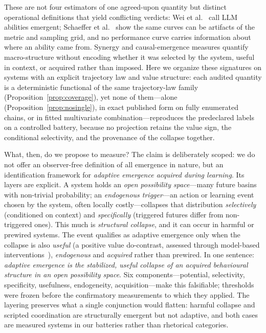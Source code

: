 \documentclass[11pt]{article}
\theoremstyle{definition}
\begin{document}
These are not four estimators of one agreed-upon quantity but distinct
operational definitions that yield conflicting verdicts: Wei et
al.~\cite{wei2022} call LLM abilities emergent; Schaeffer et
al.~\cite{schaeffer2023} show the same curves can be artifacts of the
metric and sampling grid, and no performance curve carries information
about where an ability came from. Synergy and causal-emergence
measures quantify macro-structure without encoding whether it was
selected by the system, useful in context, or acquired rather than
imposed. Here we organize these signatures on systems with an explicit
trajectory law and value structure: each audited quantity is a
deterministic functional of the same trajectory-law family
(Proposition~\ref{prop:coverage}), yet none of them---alone
(Proposition~\ref{prop:nosingle}), in exact published form on fully
enumerated chains, or in fitted multivariate combination---reproduces
the predeclared labels on a controlled battery, because no projection
retains the value sign, the conditional selectivity, and the
provenance of the collapse together.

What, then, do we propose to measure? The claim is deliberately scoped:
we do not offer an observer-free definition of all emergence in nature,
but an identification framework for \emph{adaptive emergence acquired
during learning}. Its layers are explicit. A system holds an \emph{open
possibility space}---many future basins with non-trivial probability;
an \emph{endogenous trigger}---an action or learning event chosen by
the system, often locally costly---collapses that distribution
\emph{selectively} (conditioned on context) and \emph{specifically}
(triggered futures differ from non-triggered ones). This much is
\emph{structural collapse}, and it can occur in harmful or prewired
systems. The event qualifies as adaptive emergence only when the
collapse is also \emph{useful} (a positive value do-contrast, assessed
through model-based interventions~\cite{pearl2009}), \emph{endogenous}
and \emph{acquired} rather than prewired. In one sentence:
\emph{adaptive emergence is the stabilized, useful collapse of an
acquired behavioural structure in an open possibility space}. Six
components---potential, selectivity, specificity, usefulness,
endogeneity, acquisition---make this falsifiable; thresholds were
frozen before the confirmatory measurements to which they applied. The
layering preserves what a single conjunction would flatten: harmful
collapse and scripted coordination are structurally emergent but not
adaptive, and both cases are measured systems in our batteries rather
than rhetorical categories.
\end{document}
